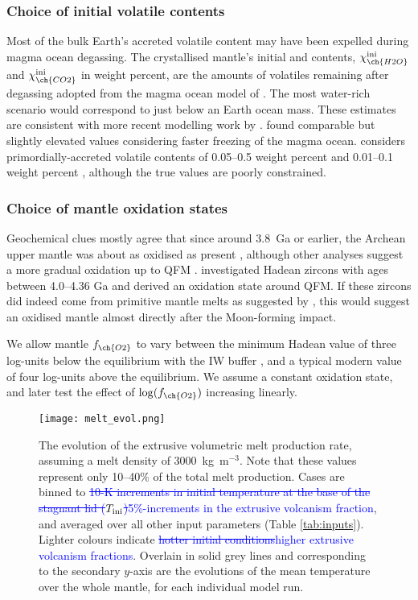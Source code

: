 \documentclass[3p,authoryear]{elsarticle}
\newcommand{\editthree}[2]{\textcolor{blue}{\sout{#1}#2}}
\begin{document}
\subsubsection{Choice of initial volatile contents}


Most of the bulk Earth's accreted volatile content may have been expelled during magma ocean degassing. The crystallised mantle's initial  and  contents, $\chi_{\ch{H2O}}^{\rm ini}$ and $\chi_{\ch{CO2}}^{\rm ini}$ in weight percent, are the amounts of volatiles remaining after degassing adopted from the magma ocean model of \citet{ELKINSTANTON2008}. The most water-rich scenario would correspond to just below an Earth ocean mass. These estimates are consistent with more recent modelling work by \citet{Barth2021}. \citet{Hiermajunder2017} found comparable but slightly elevated values considering faster freezing of the magma ocean. \citet{ELKINSTANTON2008} considers primordially-accreted volatile contents of 0.05--0.5 weight percent  and 0.01--0.1 weight percent , although the true values are poorly constrained. 


\subsubsection{Choice of mantle oxidation states}\label{sec:redox}

Geochemical clues mostly agree that since around 3.8~Ga or earlier, the Archean upper mantle was about as oxidised as present \citep{Canil1997, Delano2001, Trail2011, NICKLAS2018, Armstrong2019}, although other analyses suggest a more gradual oxidation up to QFM \citep{Aulbach2016, NICKLAS2019}. \citet{Trail2011} investigated Hadean zircons with ages between 4.0--4.36 Ga and derived an oxidation state around QFM. If these zircons did indeed come from primitive mantle melts as suggested by \citet{Trail2011}, this would suggest an oxidised mantle almost directly after the Moon-forming impact. 

We allow mantle $f_{\ch{O2}}$ to vary between the minimum Hadean value of three log-units below the equilibrium with the IW buffer \citep{Wood2006}, and a typical modern value of four log-units above the equilibrium. We assume a constant oxidation state, and later test the effect of $\log(f_{\ch{O2}})$ increasing linearly.


\begin{figure}
    \centering
    \texttt{[image: melt\_evol.png]}
    \caption{The evolution of the extrusive volumetric melt production rate, assuming a melt density of 3000~kg~m$^{-3}$. Note that these values represent only 10--40\% of the total melt production. Cases are binned to \editthree{10-K increments in initial temperature at the base of the stagnant lid ($T_{\rm{ini}}$)}{5\%-increments in the extrusive volcanism fraction}, and averaged over all other input parameters (Table \ref{tab:inputs}). Lighter colours indicate \editthree{hotter initial conditions}{higher extrusive volcanism fractions}. Overlain in solid grey lines and corresponding to the secondary $y$-axis are the evolutions of the mean temperature over the whole mantle, for each individual model run.}
    \label{fig:melt_vol}
\end{figure}
\end{document}
